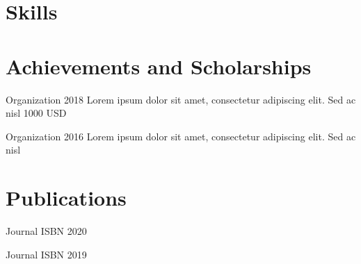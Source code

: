 \documentclass[english]{currivitae-classic}
\begin{document}
\section{Skills}

\section{Achievements and Scholarships}
            {Organization}
            {2018}
            {
             Lorem ipsum dolor sit amet, consectetur adipiscing elit. Sed ac nisl
            }
            {1000 USD}

            {Organization}
            {2016}
            {
             Lorem ipsum dolor sit amet, consectetur adipiscing elit. Sed ac nisl
            }
            {}

\section{Publications}
            {Journal}
            {ISBN}
            {2020}

            {Journal}
            {ISBN}
            {2019}
\end{document}
